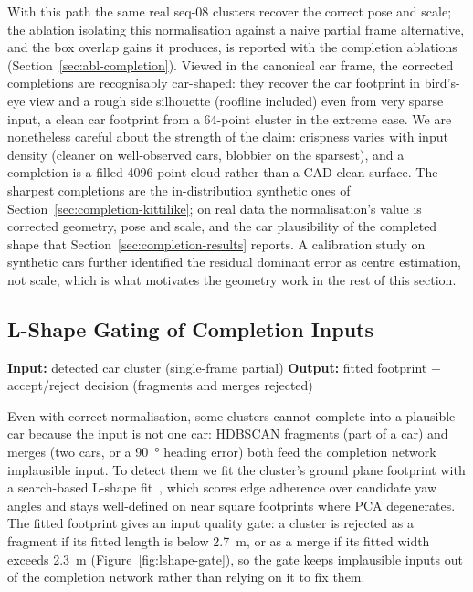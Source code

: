 \documentclass[a4paper,12pt]{report}
\begin{document}
With this path the same real seq-08 clusters recover the correct pose and scale; the
ablation isolating this normalisation against a naive partial frame alternative, and the
box overlap gains it produces, is reported with the completion ablations
(Section~\ref{sec:abl-completion}). Viewed in the
canonical car frame, the corrected completions are recognisably car-shaped: they
recover the car footprint in bird's-eye view and a rough side silhouette
(roofline included) even from very sparse input, a clean car footprint from a
\num{64}-point cluster in the extreme case. We are nonetheless careful about the
strength of the claim: crispness varies with input density (cleaner on
well-observed cars, blobbier on the sparsest), and a completion is a filled
\num{4096}-point cloud rather than a CAD clean surface. The sharpest completions
are the in-distribution synthetic ones of
Section~\ref{sec:completion-kittilike}; on real data the normalisation's value is
corrected geometry, pose and scale, and the car plausibility of the completed shape
that Section~\ref{sec:completion-results} reports. A calibration study on synthetic cars
further identified the residual dominant error as centre estimation, not scale,
which is what motivates the geometry work in the rest of this section.

\subsection{L-Shape Gating of Completion Inputs}
\label{sec:completion-lshape}

\noindent \textbf{Input:} detected car cluster (single-frame partial) \quad \textbar \quad \textbf{Output:} fitted footprint $+$ accept/reject decision (fragments and merges rejected) \vspace{0.5em}

Even with correct normalisation, some clusters cannot complete into a plausible
car because the input is not one car: HDBSCAN fragments (part of a car) and
merges (two cars, or a \SI{90}{\degree} heading error) both feed the completion
network implausible input. To detect them we fit the cluster's ground plane footprint with a
search-based L-shape fit~\cite{zhang2017lshape}, which scores edge adherence over
candidate yaw angles and stays well-defined on near square footprints where PCA
degenerates. The fitted footprint gives an input quality gate: a
cluster is rejected as a fragment if its fitted length is below \SI{2.7}{\meter},
or as a merge if its fitted width exceeds \SI{2.3}{\meter}
(Figure~\ref{fig:lshape-gate}), so the gate keeps implausible inputs out of the completion
network rather than relying on it to fix them.
\end{document}
